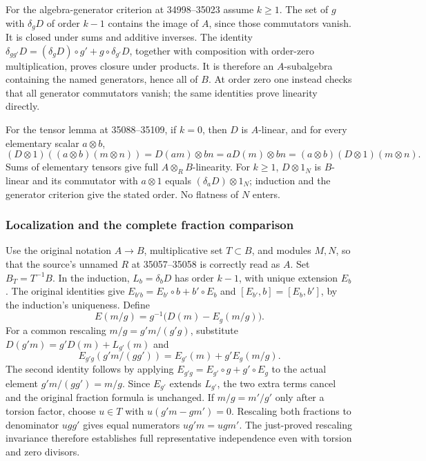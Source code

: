 For the algebra-generator criterion at 34998--35023 assume \(k\ge1\). The set of \(g\) with \(\delta_gD\) of order \(k-1\) contains the image of \(A\), since those commutators vanish. It is closed under sums and additive inverses. The identity \(\delta_{gg'}D=(\delta_gD)\circ g'+g\circ\delta_{g'}D\), together with composition with order-zero multiplication, proves closure under products. It is therefore an \(A\)-subalgebra containing the named generators, hence all of \(B\). At order zero one instead checks that all generator commutators vanish; the same identities prove linearity directly.

For the tensor lemma at 35088--35109, if \(k=0\), then \(D\) is \(A\)-linear, and for every elementary scalar \(a\otimes b\), \[
(D\otimes1)((a\otimes b)(m\otimes n))=D(am)\otimes bn
=aD(m)\otimes bn=(a\otimes b)(D\otimes1)(m\otimes n).
\] Sums of elementary tensors give full \(A\otimes_RB\)-linearity. For \(k\ge1\), \(D\otimes1_N\) is \(B\)-linear and its commutator with \(a\otimes1\) equals \((\delta_aD)\otimes1_N\); induction and the generator criterion give the stated order. No flatness of \(N\) enters.

\subsubsection{Localization and the complete fraction comparison}\label{algebra-proof-043-localization-and-the-complete-fraction-comparison}

Use the original notation \(A\to B\), multiplicative set \(T\subset B\), and modules \(M,N\), so that the source's unnamed \(R\) at 35057--35058 is correctly read as \(A\). Set \(B_T=T^{-1}B\). In the induction, \(L_b=\delta_bD\) has order \(k-1\), with unique extension \(E_b\). The original identities give \(E_{b'b}=E_{b'}\circ b+b'\circ E_b\) and \([E_{b'},b]=[E_b,b']\), by the induction's uniqueness. Define \[
E(m/g)=g^{-1}\bigl(D(m)-E_g(m/g)\bigr).
\] For a common rescaling \(m/g=g'm/(g'g)\), substitute \(D(g'm)=g'D(m)+L_{g'}(m)\) and \[
E_{g'g}(g'm/(gg'))=E_{g'}(m)+g'E_g(m/g).
\] The second identity follows by applying \(E_{g'g}=E_{g'}\circ g+g'\circ E_g\) to the actual element \(g'm/(gg')=m/g\). Since \(E_{g'}\) extends \(L_{g'}\), the two extra terms cancel and the original fraction formula is unchanged. If \(m/g=m'/g'\) only after a torsion factor, choose \(u\in T\) with \(u(g'm-gm')=0\). Rescaling both fractions to denominator \(ugg'\) gives equal numerators \(ug'm=ugm'\). The just-proved rescaling invariance therefore establishes full representative independence even with torsion and zero divisors.

